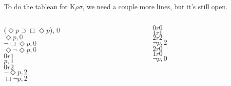 \documentclass[
  14pt,
  letterpaper,
  ignorenonframetext,
]{beamer}
\begin{document}
\begin{frame}
To do the tableau for K\(\rho \sigma\), we need a couple more lines, but
it's still open.

\begin{columns}[T]
\begin{column}{0.48\textwidth}
\begin{center}
\neg($\Diamond p \supset \Box \Diamond p$), 0 \\
$\Diamond p, 0$ \\
$\neg \Box \Diamond p, 0$ \\
$\Diamond \neg \Diamond p, 0$ \\
$0r1$ \\
$p, 1$ \\
$0r2$ \\
$\neg \Diamond p, 2$ \\
$\Box \neg p, 2$
\end{center}
\end{column}

\begin{column}{0.48\textwidth}
\begin{center}
$0r0$ \\
$1r1$ \\
$2r2$ \\
$\neg p, 2$ \\
$2r0$ \\
$1r0$ \\
$\neg p, 0$
\end{center}
\end{column}
\end{columns}
\end{frame}
\end{document}
